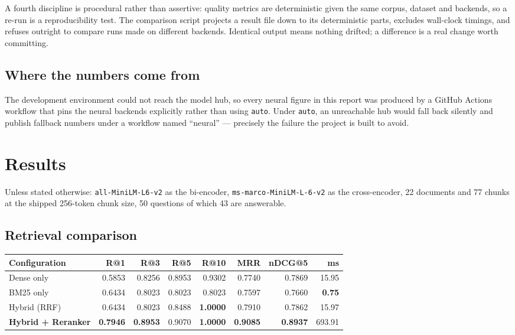 \documentclass[11pt,a4paper]{article}
\newcommand{\code}[1]{\texttt{\small #1}}
\begin{document}
A fourth discipline is procedural rather than assertive: quality metrics are
deterministic given the same corpus, dataset and backends, so a re-run is a
reproducibility test. The comparison script projects a result file down to its
deterministic parts, excludes wall-clock timings, and refuses outright to compare
runs made on different backends. Identical output means nothing drifted; a
difference is a real change worth committing.

\subsection{Where the numbers come from}

The development environment could not reach the model hub, so every neural figure
in this report was produced by a GitHub Actions workflow that pins the neural
backends explicitly rather than using \code{auto}. Under \code{auto}, an
unreachable hub would fall back silently and publish fallback numbers under a
workflow named ``neural'' --- precisely the failure the project is built to avoid.

\section{Results}

Unless stated otherwise: \code{all-MiniLM-L6-v2} as the bi-encoder,
\code{ms-marco-MiniLM-L-6-v2} as the cross-encoder, 22 documents and 77 chunks at
the shipped 256-token chunk size, 50 questions of which 43 are answerable.

\subsection{Retrieval comparison}

\begin{center}
\small
\begin{tabular}{@{}lrrrrrrr@{}}
\toprule
\textbf{Configuration} & \textbf{R@1} & \textbf{R@3} & \textbf{R@5} & \textbf{R@10} & \textbf{MRR} & \textbf{nDCG@5} & \textbf{ms} \\
\midrule
Dense only          & 0.5853 & 0.8256 & 0.8953 & 0.9302 & 0.7740 & 0.7869 & 15.95 \\
BM25 only           & 0.6434 & 0.8023 & 0.8023 & 0.8023 & 0.7597 & 0.7660 & \textbf{0.75} \\
Hybrid (RRF)        & 0.6434 & 0.8023 & 0.8488 & \textbf{1.0000} & 0.7910 & 0.7862 & 15.97 \\
\textbf{Hybrid + Reranker} & \textbf{0.7946} & \textbf{0.8953} & 0.9070 & \textbf{1.0000} & \textbf{0.9085} & \textbf{0.8937} & 693.91 \\
\bottomrule
\end{tabular}
\end{center}
\end{document}
